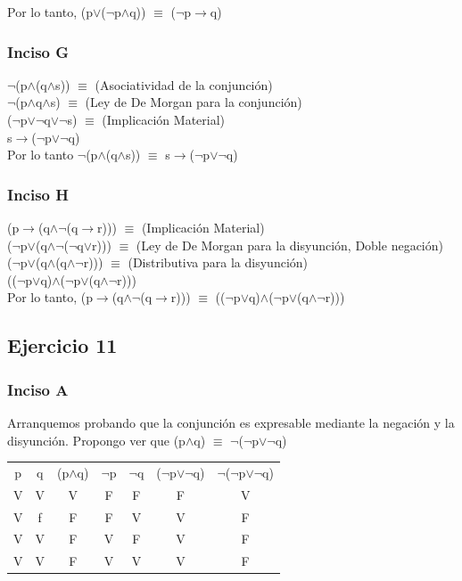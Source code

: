 		Por lo tanto, (p$\vee$($\neg$p$\wedge$q)) $\equiv$ ($\neg$p$\rightarrow$q)
		
		\subsubsection{Inciso G}
		$\neg$(p$\wedge$(q$\wedge$s)) $\equiv$ (Asociatividad de la conjunción)\\
		$\neg$(p$\wedge$q$\wedge$s) $\equiv$ (Ley de De Morgan para la conjunción)\\
		($\neg$p$\vee$$\neg$q$\vee$$\neg$s) $\equiv$ (Implicación Material)\\
		s$\rightarrow$($\neg$p$\vee$$\neg$q)\\
		
		Por lo tanto $\neg$(p$\wedge$(q$\wedge$s)) $\equiv$ s$\rightarrow$($\neg$p$\vee$$\neg$q)
		
		\subsubsection{Inciso H}
		(p$\rightarrow$(q$\wedge$$\neg$(q$\rightarrow$r))) $\equiv$ (Implicación Material)\\
		($\neg$p$\vee$(q$\wedge$$\neg$($\neg$q$\vee$r))) $\equiv$ (Ley de De Morgan para la disyunción, Doble negación)\\
		($\neg$p$\vee$(q$\wedge$(q$\wedge$$\neg$r))) $\equiv$ (Distributiva para la disyunción)\\
		(($\neg$p$\vee$q)$\wedge$($\neg$p$\vee$(q$\wedge$$\neg$r)))\\
		
		Por lo tanto, (p$\rightarrow$(q$\wedge$$\neg$(q$\rightarrow$r))) $\equiv$ (($\neg$p$\vee$q)$\wedge$($\neg$p$\vee$(q$\wedge$$\neg$r)))
		
	\subsection{Ejercicio 11}
		\subsubsection{Inciso A}
		Arranquemos probando que la conjunción es expresable mediante la negación y la disyunción. Propongo ver que (p$\wedge$q) $\equiv$ $\neg$($\neg$p$\vee$$\neg$q)\\
		\begin{tabular}{c|c|c|c|c|c|c}
			p & q & (p$\wedge$q) & $\neg$p & $\neg$q & ($\neg$p$\vee$$\neg$q) & $\neg$($\neg$p$\vee$$\neg$q)\\
			V & V & V & F & F & F & V\\
			V & f & F & F & V & V & F\\
			V & V & F & V & F & V & F\\
			V & V & F & V & V & V & F\\
		\end{tabular}
		
